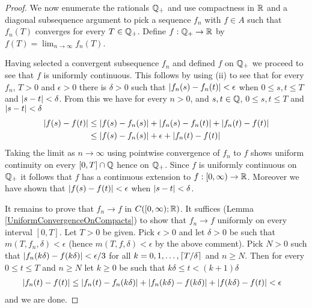 \begin{proof}
We now enumerate the rationals $\mathbb{Q}_+$ and use
compactness in $\mathbb{R}$ and a diagonal
subsequence argument to pick a sequence $f_n$ with $f \in A$ such that
$f_n(T)$ converges for every $T \in \mathbb{Q}_+$.  Define $f :
\mathbb{Q}_+ \to \mathbb{R}$ by $f(T) = \lim_{n \to \infty} f_n(T)$.

Having selected a convergent subsequence $f_n$ and defined $f$ on
$\mathbb{Q}_+$ we proceed to see that $f$ is uniformly continuous.
This follows by using (ii) to see that for every $f_n$, $T > 0$ and 
$\epsilon > 0$ there is $\delta > 0$ such that $\left \vert f_n(s) - f_n(t) \right \vert <
\epsilon$ when $0 \leq s,t \leq T$ and $\left \vert s - t \right \vert <\delta$.  From
this we have for every $n>0$, and $s,t \in \mathbb{Q}$, $0 \leq s,t
\leq T$ and $\left \vert s-t \right \vert < \delta$
\begin{align*}
\left \vert f(s) -f(t) \right \vert &\leq \left \vert f(s) -f_n(s) \right \vert + \left \vert f_n(s) -f_n(t) \right \vert +
\left \vert f_n(t) - f(t) \right \vert \\
&\leq \left \vert f(s) -f_n(s) \right \vert + \epsilon +
\left \vert f_n(t) - f(t) \right \vert
\end{align*}
Taking the limit as $n \to \infty$ using pointwise convergence of
$f_n$ to $f$ shows uniform continuity on every
$[0,T] \cap \mathbb{Q}$ hence on $\mathbb{Q}_+$.  Since $f$ is uniformly continuous on
$\mathbb{Q}_+$ it follows that $f$ has a continuous extension to $f :
[0,\infty) \to \mathbb{R}$.  Moreover we have shown that $\left \vert f(s) -f(t) \right \vert
< \epsilon$ when $\left \vert s -t \right \vert < \delta$.

It remains to prove that $f_n \to f$ in $C([0,\infty); \mathbb{R})$.  It
suffices (Lemma \ref{UniformConvergenceOnCompacts}) to show that $f_n
\to f$ uniformly on every interval $[0,T]$.  Let $T > 0$ be given.
Pick $\epsilon > 0$ and let
$\delta > 0$ be such that $m(T,f_n,\delta) < \epsilon$ (hence $m(T,f,\delta)
< \epsilon$ by the above comment).   Pick $N > 0$ such that
$\left \vert f_n(k\delta) - f(k\delta) \right \vert < \epsilon/3$ for all $k=0,1, \dotsc,
\lceil T/\delta \rceil$ and $n \geq N$.  Then for every $0 \leq t \leq T$ and
$n \geq N$ let $k\geq 0$ be such that $k\delta \leq t < (k+1)\delta$
\begin{align*}
\left \vert f_n(t) - f(t) \right \vert &\leq \left \vert f_n(t) - f_n(k\delta) \right \vert
+\left \vert f_n(k\delta) - f(k\delta) \right \vert +\left \vert f(k\delta) - f(t) \right \vert < \epsilon
\end{align*}
and we are done.
\end{proof}


